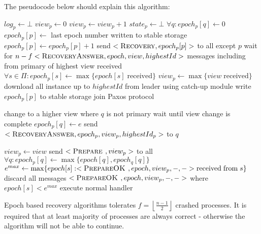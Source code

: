 The pseudocode below should explain this algorithm:
\begin{algorithmic}[1]
  \INIT{}
    \STATE $log_p \leftarrow \bot$ %
    \STATE $view_p \leftarrow 0$
      \STATE $view_p \leftarrow view_p + 1$
    \ENDIF
    \STATE $state_p \leftarrow \bot$ %
    \STATE $\forall q : epoch_p[q] \leftarrow 0$
    \STATE
      \STATE $epoch_p[p] \leftarrow$ last epoch number written to stable storage
      \STATE $epoch_p[p] \leftarrow epoch_p[p] + 1$
      \STATE send $<\textsc{Recovery}, epoch_p[p]>$ to all except $p$
      \STATE wait for $n-f <\textsc{RecoveryAnswer}, epoch, view, highestId>$ messages including from primary of highest view received
      \STATE $\forall s \in \Pi : epoch_p[s] \leftarrow \max\{{epoch[s] \; \mathrm{ received}}\}$
      \STATE $view_p \leftarrow \max\{{ view \; \mathrm{received}}\}$
      \STATE download all instance up to $highestId$ from leader using catch-up module
    \ENDIF
      \STATE write $epoch_p[p]$ to stable storage
    \STATE
    \STATE join Paxos protocol
  \ENDINIT

  \vspace{1em}
      \STATE change to a higher view where $q$ is not primary
      \STATE wait until view change is complete
    \ENDIF
    \STATE $epoch_p[q] \leftarrow e$
    \STATE send $<\textsc{RecoveryAnswer}, epoch_p, view_p, highestId_p>$ to $q$
  \ENDUPON

  \vspace{1em}
      \STATE $view_p \leftarrow view$
      \STATE send $<\textsc{Prepare }, view_p>$ to all
    \ELSE
      \STATE $\forall q : epoch_p[q] \leftarrow \max\{{epoch[q], epoch_q[q]}\}$
        \STATE $e^{max} \leftarrow \max\{{epoch[s] : <\textsc{PrepareOK }, epoch, view_p, -, -> \mathrm{received \; from}\; s}\}$
        \STATE discard all messages $<\textsc{PrepareOK }, epoch, view_p, -, ->$ where $epoch[s] < e^{max}$
      \ENDFOR
      \STATE execute normal handler 
    \ENDIF
  \ENDUPON
\end{algorithmic}

Epoch based recovery algorithms tolerates $f = \left\lfloor \frac{n-1}{2} \right\rfloor $ crashed processes. It is required that at least majority of processes are always correct - otherwise the algorithm will not be able to continue.

